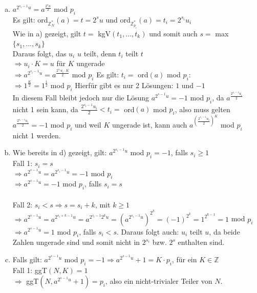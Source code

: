 \documentclass[a4paper]{scrartcl}
\begin{document}
\begin{enumerate}[a)]
\item $a^{2^{s_i-1}u}= a^{\frac{2^{s}u}{2}}$ mod $p_i$\\
Es gilt: ord$_{\mathbb{Z}_N^*}(a)=t=2^{s}u$ und ord$_{\mathbb{Z}_{p_i}^*}(a)=t_i=2^{s_i}u_i$\\
Wie in a) gezeigt, gilt $t=$ kgV$(t_1,...,t_k)$ und somit auch $s=$ max$\{s_1, ...,s_k\}$\\
Daraus folgt, das $u_i$ $u$ teilt, denn $t_i$ teilt $t$\\
$\Rightarrow u_i \cdot K = u$ für $K$ ungerade\\
$\Rightarrow a^{2^{s_i-1}u}=a^{\frac{2^{s_i}u_i\cdot K}{2}}$ mod $p_i$ Es gilt: $t_i = $ ord$(a)$ mod $p_i$:\\
$\Rightarrow 1^{\frac{K}{2}} = 1^{\frac{1}{2}}$ mod $p_i$ Hierfür gibt es nur 2 Lösungen: $1$ und $-1$\\
In diesem Fall bleibt jedoch nur die Lösung $a^{2^{s-1}u}= -1$ mod $p_i$, da $a^{\frac{2^{s_i-1}u_i}{2}}$ nicht 1 sein kann, da $\frac{2^{s_i-1}u_i}{2} < t_i =$ ord$(a)$ mod $p_i$, also muss gelten $a^{\frac{2^{s_i-1}u_i}{2}}=-1$ mod $p_i$ und weil $K$ ungerade ist, kann auch $a^{(\frac{2^{s_i-1}u_i}{2})^K}$ mod $p_i$ nicht 1 werden.

\item Wie bereits in d) gezeigt, gilt: $a^{2^{s_i-1}u}$ mod $ p_i=-1$, falls $s_i\geq 1$\\
Fall 1: $s_i=s$\\
$\Rightarrow a^{2^{s-1}u} = a^{2^{s_i-1}u}=-1$ mod $p_i$\\
$\Rightarrow a^{2^{s-1}u} = -1$ mod $p_i$, falls $s_i=s$\\\\

Fall 2: $s_i < s \Rightarrow s = s_i+k$, mit $k\geq 1$\\
$\Rightarrow a^{2^{s-1}u} = a^{2^{s_i+k-1}u}=a^{2^{s_i-1}2^ku} = (a^{2^{s_i-1}u})^{2^k} = (-1)^{2^k} = 1^{2^{k-1}}= 1$ mod $p_i$\\
$\Rightarrow a^{2^{s-1}u} = 1$ mod $p_i$, falls $s_i<s$. Daraus folgt auch: $u_i$ teilt $u$, da beide Zahlen ungerade sind und somit nicht in $2^{s_i}$ bzw. $2^s$ enthalten sind.\\



\item
Falls gilt: $a^{2^{s-1}u}$ mod $p_i=-1 \Rightarrow a^{2^{s-1}u}+1=K\cdot p_i$, für ein $K\in \mathbb{Z}$\\
Fall 1: ggT$(N,K)=1$\\
$\Rightarrow$ ggT$(N, a^{2^{s-1}u}+1) = p_i$, also ein nicht-trivialer Teiler von $N$.\\\\


\end{enumerate}
\end{document}
